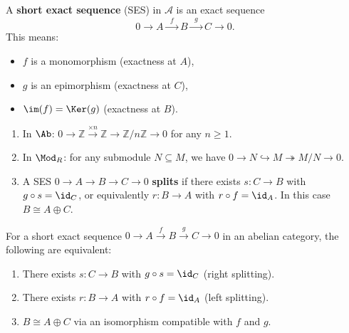 \begin{definition}\label{def:ses}
A \textbf{short exact sequence} (SES) in $\mathcal{A}$ is an exact sequence
\[
    0 \longrightarrow A \xrightarrow{\;\;f\;\;} B \xrightarrow{\;\;g\;\;} C \longrightarrow 0.
\]
This means:
\begin{itemize}
    \item $f$ is a monomorphism (exactness at $A$),
    \item $g$ is an epimorphism (exactness at $C$),
    \item $\im(f) = \Ker(g)$ (exactness at $B$).
\end{itemize}
\end{definition}

\begin{example}\label{ex:ses-examples}
\begin{enumerate}
    \item In $\Ab$: $0 \to \mathbb{Z} \xrightarrow{\times n} \mathbb{Z} \to \mathbb{Z}/n\mathbb{Z} \to 0$
    for any $n \geq 1$.
    \item In $\Mod_R$: for any submodule $N \subseteq M$, we have
    $0 \to N \hookrightarrow M \twoheadrightarrow M/N \to 0$.
    \item A SES $0 \to A \to B \to C \to 0$ \textbf{splits}
    if there exists $s \colon C \to B$ with $g \circ s = \id_C$, or equivalently
    $r \colon B \to A$ with $r \circ f = \id_A$. In this case $B \cong A \oplus C$.
\end{enumerate}
\end{example}

\begin{proposition}\label{prop:splitting-lemma}
For a short exact sequence $0 \to A \xrightarrow{f} B \xrightarrow{g} C \to 0$
in an abelian category, the following are equivalent:
\begin{enumerate}
    \item There exists $s \colon C \to B$ with $g \circ s = \id_C$ (right splitting).
    \item There exists $r \colon B \to A$ with $r \circ f = \id_A$ (left splitting).
    \item $B \cong A \oplus C$ via an isomorphism compatible with $f$ and $g$.
\end{enumerate}
\end{proposition}

